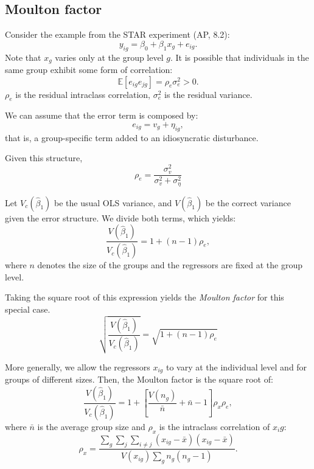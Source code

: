 \documentclass[11pt, a4paper]{report}
\theoremstyle{plain}
\theoremstyle{plain}
\theoremstyle{remark}
\begin{document}
\subsection{Moulton factor}

Consider the example from the STAR experiment (AP, 8.2):
\begin{equation}
    y_{ig} = \beta_0 + \beta_1 x_g + e_{ig}.
\end{equation}
Note that $x_g$ varies only at the group level $g$. It is possible that individuals in the same group exhibit some form of correlation:
\begin{equation}
    \mathbb{E}[e_{ig}e_{jg}] = \rho_e \sigma^2_e > 0.
\end{equation}
$\rho_e$ is the residual intraclass correlation, $\sigma^2_e$ is the residual variance. 

We can assume that the error term is composed by:
\begin{equation}
    e_{ig} = v_g + \eta_{ig},
\end{equation}
that is, a group-specific term added to an idiosyncratic disturbance. 

Given this structure, 
\begin{equation}
    \rho_e = \dfrac{\sigma_v^2}{\sigma_v^2 + \sigma_\eta^2}
\end{equation}

Let $V_c(\hat{\beta}_1)$ be the usual OLS variance, and $V(\hat{\beta}_1)$ be the correct variance given the error structure. We divide both terms, which yields:
\begin{equation}
    \dfrac{V\left(\hat{\beta}_{1}\right)}{V_{c}\left(\hat{\beta}_{1}\right)}=1+(n-1) \rho_{e},
    \end{equation}
where $n$ denotes the size of the groups and the regressors are fixed at the group level.

Taking the square root of this expression yields the \textit{Moulton factor} for this special case.
\begin{equation}
    \sqrt{\dfrac{V\left(\hat{\beta}_{1}\right)}{V_{c}\left(\hat{\beta}_{1}\right)}}=\sqrt{1+(n-1) \rho_{e}}
\end{equation}

More generally, we allow the regressors $x_{ig}$ to vary at the individual level and for groups of different sizes. Then, the Moulton factor is the square root of:
\begin{equation}
    {\frac{V\left(\hat{\beta}_{1}\right)}{V_{c}\left(\hat{\beta}_{1}\right)}}={1+\left[\frac{V\left(n_{g}\right)}{\bar{n}}+\bar{n}-1\right] \rho_{x} \rho_{e}}, \label{moulton_correction}
    \end{equation}
where $\bar{n}$ is the average group size and $\rho_x$ is the intraclass correlation of $x_ig$:
\begin{equation}
    \rho_{x}=\frac{\sum_{g} \sum_{j} \sum_{i \neq j}\left(x_{i g}-\bar{x}\right)\left(x_{i g}-\bar{x}\right)}{V\left(x_{i g}\right) \sum_{g} n_{g}\left(n_{g}-1\right)} .
\end{equation}
\end{document}
